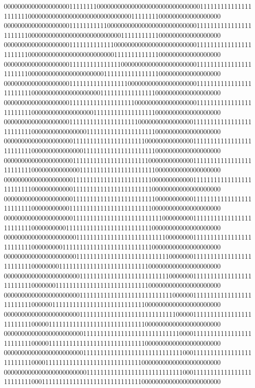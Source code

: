 000000000000000000011111111000000000000000000000000000000111111111111111111111100000000000000000000000000000011111111000000000000000000
000000000000000000011111111111000000000000000000000000001111111111111111111111100000000000000000000000000011111111111000000000000000000
000000000000000000011111111111110000000000000000000000001111111111111111111111100000000000000000000000001111111111111000000000000000000
000000000000000000011111111111111100000000000000000000001111111111111111111111100000000000000000000001111111111111111000000000000000000
000000000000000000011111111111111111000000000000000000001111111111111111111111110000000000000000000011111111111111110000000000000000000
000000000000000000011111111111111111110000000000000000001111111111111111111111110000000000000000001111111111111111110000000000000000000
000000000000000000011111111111111111111000000000000000011111111111111111111111110000000000000000111111111111111111110000000000000000000
000000000000000000001111111111111111111110000000000000011111111111111111111111110000000000000001111111111111111111110000000000000000000
000000000000000000001111111111111111111111000000000000011111111111111111111111110000000000000011111111111111111111110000000000000000000
000000000000000000001111111111111111111111100000000000011111111111111111111111110000000000001111111111111111111111100000000000000000000
000000000000000000001111111111111111111111110000000000011111111111111111111111110000000000011111111111111111111111100000000000000000000
000000000000000000001111111111111111111111111100000000011111111111111111111111110000000000111111111111111111111111100000000000000000000
000000000000000000000111111111111111111111111110000000011111111111111111111111110000000001111111111111111111111111100000000000000000000
000000000000000000000111111111111111111111111111000000011111111111111111111111110000000011111111111111111111111111000000000000000000000
000000000000000000000011111111111111111111111111000000011111111111111111111111110000000111111111111111111111111111000000000000000000000
000000000000000000000011111111111111111111111111100000011111111111111111111111110000001111111111111111111111111110000000000000000000000
000000000000000000000011111111111111111111111111110000011111111111111111111111110000011111111111111111111111111110000000000000000000000
000000000000000000000001111111111111111111111111111000011111111111111111111111110000011111111111111111111111111110000000000000000000000
000000000000000000000001111111111111111111111111111100011111111111111111111111110000111111111111111111111111111100000000000000000000000
000000000000000000000000111111111111111111111111111100011111111111111111111111110001111111111111111111111111111100000000000000000000000
